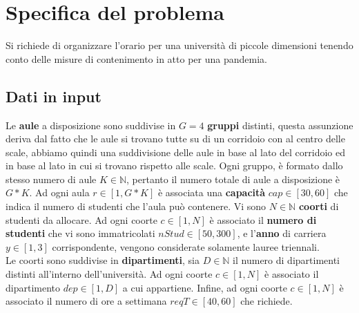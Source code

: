 \documentclass[12pt,english, openany]{book}
\begin{document}
\chapter{Specifica del problema}
Si richiede di organizzare l'orario per una università di piccole dimensioni tenendo conto delle misure di contenimento in atto per una pandemia.

\section{Dati in input}
Le \textbf{aule} a disposizione sono suddivise in $G = 4$ \textbf{gruppi} distinti, questa assunzione deriva dal fatto che le aule si trovano tutte su di un corridoio con al centro delle scale, abbiamo quindi una suddivisione delle aule in base al lato del corridoio ed in base al lato in cui si trovano rispetto alle scale. Ogni gruppo, è formato dallo stesso numero di aule $K \in \mathbb{N}$, pertanto il numero totale di aule a disposizione è $G*K$.
Ad ogni aula $r \in \left[ 1,  G*K \right]$ è associata una \textbf{capacità} $cap \in \left[ 30,  60 \right]$ che indica il numero di studenti che l'aula può contenere.
Vi sono $N \in \mathbb{N}$ \textbf{coorti} di studenti da allocare. Ad ogni coorte $c \in \left[1, N \right]$ è associato il \textbf{numero di studenti} che vi sono immatricolati $nStud \in \left[50, 300 \right]$, e l'\textbf{anno} di carriera $y \in \left[1, 3 \right]$ corrispondente, vengono considerate solamente lauree triennali.\\
Le coorti sono suddivise in \textbf{dipartimenti}, sia $D \in \mathbb{N}$ il numero di dipartimenti distinti all'interno dell'università. Ad ogni coorte $c \in \left[1, N \right]$ è associato il dipartimento $dep \in \left[1, D \right]$ a cui appartiene.
Infine, ad ogni coorte $c \in \left[1, N \right]$ è associato il numero di ore a settimana $reqT \in \left[40, 60\right]$ che richiede.
\end{document}
